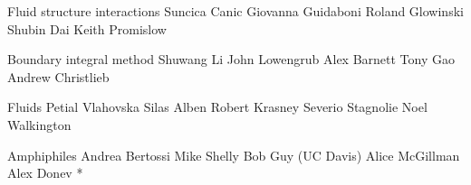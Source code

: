 Fluid structure interactions
Suncica Canic
Giovanna Guidaboni
Roland Glowinski
Shubin Dai
Keith Promislow


Boundary integral method
Shuwang Li
John Lowengrub
Alex Barnett
Tony Gao
Andrew Christlieb


Fluids
Petial Vlahovska
Silas Alben
Robert Krasney
Severio Stagnolie
Noel Walkington


Amphiphiles
Andrea Bertossi
Mike Shelly
Bob Guy (UC Davis)
Alice McGillman
Alex Donev *
